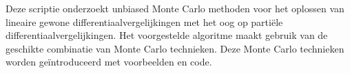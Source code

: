 Deze scriptie onderzoekt unbiased Monte Carlo methoden voor
het oplossen van lineaire gewone differentiaalvergelijkingen met het
oog op partiële differentiaalvergelijkingen.
Het voorgestelde algoritme maakt gebruik van de geschikte
combinatie van Monte Carlo technieken. Deze Monte Carlo technieken
worden geïntroduceerd met voorbeelden en code.